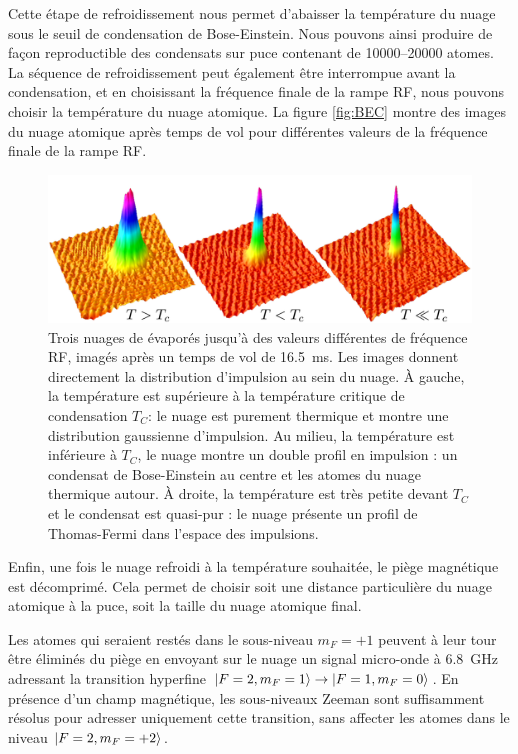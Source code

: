 Cette étape de refroidissement nous permet d'abaisser la température du nuage sous le seuil de condensation de Bose-Einstein.
Nous pouvons ainsi produire de façon reproductible des condensats sur puce contenant de \SIrange{10000}{20000}{} atomes.
La séquence de refroidissement peut également être interrompue avant la condensation, et en choisissant la fréquence finale de la rampe RF, nous pouvons choisir la température du nuage atomique.
La figure \eqref{fig:BEC} montre des images du nuage atomique après temps de vol pour différentes valeurs de la fréquence finale de la rampe RF.
%
\begin{figure}[!h]
\centering
\includegraphics[width=.8\linewidth]{figures/setup/coldatoms/BEC}
\caption[Condensat de Bose-Einstein sur puce]{
Trois nuages de  évaporés jusqu'à des valeurs différentes de fréquence RF, imagés après un temps de vol de \SI{16.5}{\ms}.
Les images donnent directement la distribution d'impulsion au sein du nuage.
\`A gauche, la température est supérieure à la température critique de condensation $T_C$: le nuage est purement thermique et montre une distribution gaussienne d'impulsion.
Au milieu, la température est inférieure à $T_C$, le nuage montre un double profil en impulsion : un condensat de Bose-Einstein au centre et les atomes du nuage thermique autour.
\`A droite, la température est très petite devant $T_C$ et le condensat est quasi-pur : le nuage présente un profil de Thomas-Fermi dans l'espace des impulsions.
}
\label{fig:BEC}
\end{figure}
%

Enfin, une fois le nuage refroidi à la température souhaitée, le piège magnétique est décomprimé.
Cela permet de choisir soit une distance particulière du nuage atomique à la puce, soit la taille du nuage atomique final.

Les atomes qui seraient restés dans le sous-niveau $m_F=+1$ peuvent à leur tour être éliminés du piège en envoyant sur le nuage un signal micro-onde à \SI{6.8}{\GHz} adressant la transition hyperfine $\ket{F=2,m_F=1} \rightarrow \ket{F=1,m_F=0}$.
En présence d'un champ magnétique, les sous-niveaux Zeeman sont suffisamment résolus pour adresser uniquement cette transition, sans affecter les atomes dans le niveau $\ket{F=2,m_F=+2}$.

